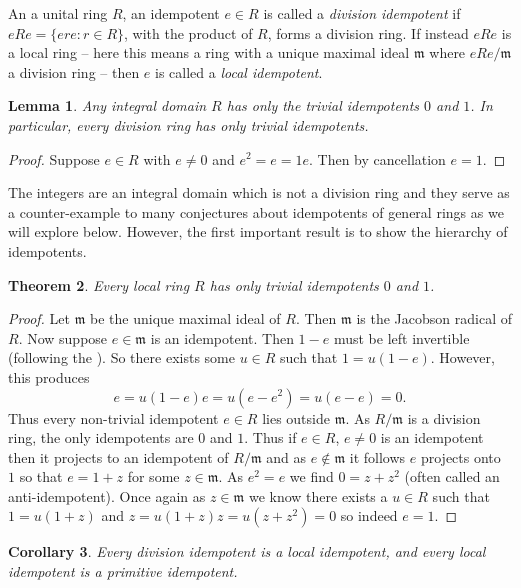 \documentclass[12pt]{article}
\newtheorem{thm}{Theorem}
\newtheorem{coro}[thm]{Corollary}
\newtheorem{lemma}[thm]{Lemma}
\begin{document}
An a unital ring $R$, an idempotent $e\in R$ is called a \emph{division idempotent}
if $eRe=\{ere:r\in R\}$, with the product of $R$, forms a division ring.
If instead $eRe$ is a local ring -- here this means a ring with a unique maximal
ideal $\mathfrak{m}$ where $eRe/\mathfrak{m}$ a division ring -- then 
$e$ is called a \emph{local idempotent}.

\begin{lemma}
Any integral domain $R$ has only the trivial idempotents $0$ and $1$.  In particular, every division ring has only trivial idempotents.
\end{lemma}
\begin{proof}
Suppose $e\in R$ with $e\neq 0$ and $e^2=e=1e$.  Then by cancellation $e=1$.
\end{proof}

The integers are an integral domain which is not a division ring and they
serve as a counter-example to many conjectures about idempotents of general
rings as we will explore below.  However, the first important result is to
show the hierarchy of idempotents.

\begin{thm}
Every local ring $R$ has only trivial idempotents $0$ and $1$.
\end{thm}
\begin{proof}
Let $\mathfrak{m}$ be the unique maximal ideal of $R$.  Then $\mathfrak{m}$
is the Jacobson radical of $R$.  Now suppose $e\in \mathfrak{m}$ is an 
idempotent.  Then $1-e$ must be left invertible (following the
).  So there exists some 
$u\in R$ such that $1=u(1-e)$.  However, this produces
\[e=u(1-e)e=u(e-e^2)=u(e-e)=0.\]
Thus every non-trivial idempotent $e\in R$ lies outside $\mathfrak{m}$.
As $R/\mathfrak{m}$ is a division ring, the only idempotents are $0$ and $1$.
Thus if $e\in R$, $e\neq 0$ is an idempotent then it projects to an
idempotent of $R/\mathfrak{m}$ and as $e\notin \mathfrak{m}$ it follows
$e$ projects onto $1$ so that $e=1+z$ for some $z\in\mathfrak{m}$.  As 
$e^2=e$ we find $0=z+z^2$ (often called an anti-idempotent).  Once again 
as $z\in\mathfrak{m}$ we know there exists a $u\in R$ such that $1=u(1+z)$
and $z=u(1+z)z=u(z+z^2)=0$ so indeed $e=1$.
\end{proof}

\begin{coro}
Every division idempotent is a local idempotent, and every local idempotent
is a primitive idempotent.
\end{coro}
\end{document}
